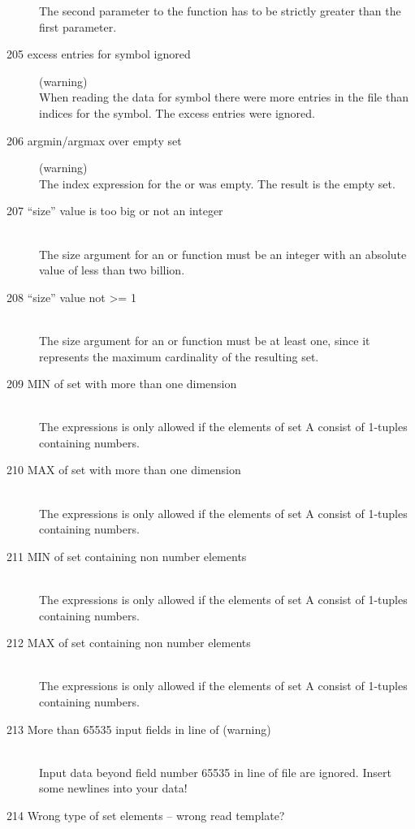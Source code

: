 \begin{description}
  The second parameter to the function  has to be
  strictly greater than the first parameter.
\item[205 \code{xxx} excess entries for symbol \code{yyy} ignored ]
  (warning)\ \\
  When reading the data for symbol  there were 
   more entries in the file than indices for the symbol.
  The excess entries were ignored.  
\item[206 argmin/argmax over empty set] (warning)\ \\
   The index expression for the  or  was
   empty. The result is the empty set.
\item[207 ``size'' value \code{xxx} is too big or not an integer]\ \\
   The size argument for an  or  function
   must be an integer with an absolute value of less than two billion.
\item[208 ``size'' value \code{xxx} not >= 1]\ \\
   The size argument for an  or  function
   must be at least one, since it represents the maximum cardinality
   of the resulting set.
\item[209 MIN of set with more than one dimension]\ \\
   The expressions  is only allowed if the elements of 
   set A consist of 1-tuples containing numbers.  
\item[210 MAX of set with more than one dimension]\ \\
   The expressions  is only allowed if the elements of 
   set A consist of 1-tuples containing numbers.  
\item[211 MIN of set containing non number elements]\ \\
   The expressions  is only allowed if the elements of 
   set A consist of 1-tuples containing numbers.  
\item[212 MAX of set containing non number elements]\ \\
   The expressions  is only allowed if the elements of 
   set A consist of 1-tuples containing numbers.  
\item[213 More than 65535 input fields in line \code{xxx} of
   \code{yyy} (warning)]\ \\
   Input data beyond field number 65535 in line  of file
    are ignored. Insert some newlines into your data!
\item[214 Wrong type of set elements -- wrong read template?]\ \\

\end{description}
